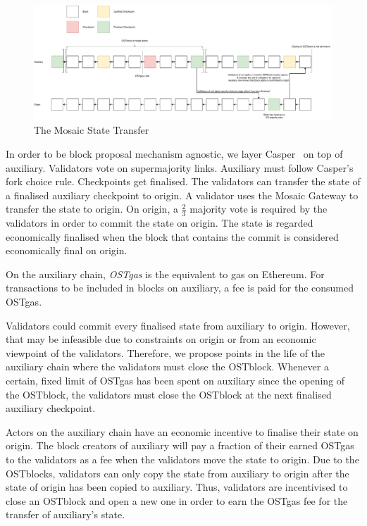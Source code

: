 \documentclass[12pt,a4paper]{article}
\begin{document}
\begin{figure}
    \centering
	\includegraphics[width=\textwidth]{mosaic}
	\caption{The Mosaic State Transfer}
	\label{fig:mosaic}
\end{figure}
In order to be block proposal mechanism agnostic, we layer Casper~\cite{casperffg} on top of auxiliary.
Validators vote on supermajority links.
Auxiliary must follow Casper's fork choice rule.
Checkpoints get finalised.
The validators can transfer the state of a finalised auxiliary checkpoint to origin.
A validator uses the Mosaic Gateway to transfer the state to origin.
On origin, a $\frac{2}{3	}$ majority vote is required by the validators in order to commit the state on origin.
The state is regarded economically finalised when the block that contains the commit is considered economically final on origin.

On the auxiliary chain, \emph{OSTgas} is the equivalent to gas on Ethereum.
For transactions to be included in blocks on auxiliary, a fee is paid for the consumed OSTgas.

Validators could commit every finalised state from auxiliary to origin.
However, that may be infeasible due to constraints on origin or from an economic viewpoint of the validators.
Therefore, we propose points in the life of the auxiliary chain where the validators must close the OSTblock.
Whenever a certain, fixed limit of OSTgas has been spent on auxiliary since the opening of the OSTblock,
the validators must close the OSTblock at the next finalised auxiliary checkpoint. 

Actors on the auxiliary chain have an economic incentive to finalise their state on origin.
The block creators of auxiliary will pay a fraction of their earned OSTgas to the validators as a fee when the validators move the state to origin.
Due to the OSTblocks, validators can only copy the state from auxiliary to origin after the state of origin has been copied to auxiliary.
Thus, validators are incentivised to close an OSTblock and open a new one in order to earn the OSTgas fee for the transfer of auxiliary's state.
\end{document}
